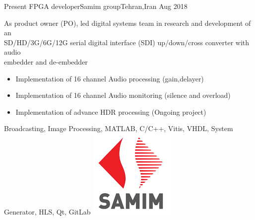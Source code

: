 
\begin{experiences}

  \experience
  {Present} {FPGA developer}{Samim group}{Tehran,Iran}
  {Aug 2018} {
    As product owner (PO), led digital systems team in research and development of an \\
    SD/HD/3G/6G/12G serial digital interface (SDI) up/down/cross converter with audio \\
    embedder and de-embedder
    \begin{itemize}
      \item Implementation of 16 channel Audio processing (gain,delayer)
      \item Implementation of 16 channel Audio  monitoring (silence and overload)
      \item Implementation of advance HDR processing (Ongoing project)
    \end{itemize}
  }
  {Broadcasting, Image Processing, MATLAB, C/C++, Vitis, VHDL, System Generator, HLS, Qt, GitLab}
  {\includegraphics[scale=0.2]{graphics/samim_logo}}

  \emptySeparator


\end{experiences}
